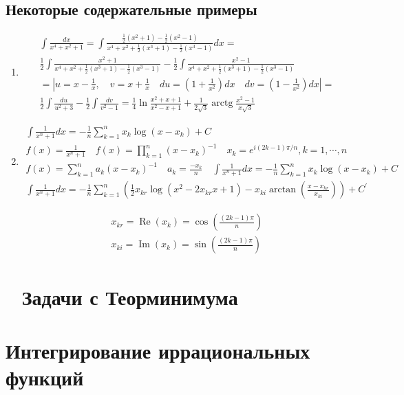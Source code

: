 \documentclass[a4paper,12pt]{article}
\begin{document}
	\subsection{Некоторые содержательные примеры}
	\begin{enumerate}
		\item
			$$
			\begin{aligned}
				\int \frac{d x}{x^{4}+x^{2}+1}=\int \frac{\frac{1}{2}\left(x^{2}+1\right)-\frac{1}{2}\left(x^{2}-1\right)}{x^{4}+x^{2} + \frac{1}{2}\left(x^{3}+1\right)-\frac{1}{2}\left(x^{3}-1\right)} d x =\\ \frac{1}{2} \int \frac{x^{2}+1}{x^4+x^2+\frac{1}{2}\left(x^3+1\right)-\frac{1}{2}\left(x^3-1\right)} -
				\frac{1}{2} \int \frac{x^{2}-1}{x^4+x^2+\frac{1}{2}\left(x^3+1\right)-\frac{1}{2}\left(x^3-1\right)} \\
				=\left|u=x-\frac{1}{x}, \quad v=x+\frac{1}{x} \quad  d u = \left(1+\frac{1}{x^2}\right) d x \quad d v = \left(1-\frac{1}{x^2}\right) d x\right| =\\
				\frac{1}{2} \int \frac{du}{u^2+3} - \frac{1}{2} \int \frac{dv}{v^2-1}=\frac{1}{4} \ln \frac{x^{2}+x+1}{x^{2}-x+1}+\frac{1}{2 \sqrt{3}} \operatorname{arctg} \frac{x^{2}-1}{x \sqrt{3}}	
			\end{aligned}
			$$
		\item 
			$$
			\begin{aligned}
			\int \frac{1}{x^{n}+1} d x=-\frac{1}{n} \sum_{k=1}^{n} x_{k} \log \left(x-x_{k}\right)+C \\
			f(x)=\frac{1}{x^{n}+1} \quad f(x)=\prod_{k=1}^{n}\left(x-x_{k}\right)^{-1} 
		    \quad x_{k}=e^{i(2 k-1) \pi / n}, k=1, \cdots, n \\
			f(x)=\sum_{k=1}^{n} a_{k}\left(x-x_{k}\right)^{-1} 
			\quad a_{k}=\frac{-x_{k}}{n}
			\quad
			\int \frac{1}{x^{n}+1} d x=-\frac{1}{n} \sum_{k=1}^{n} x_{k} \log \left(x-x_{k}\right)+C\\
			\int \frac{1}{x^{n}+1} d x=-\frac{1}{n} \sum_{k=1}^{n}\left(\frac{1}{2} x_{k r} \log \left(x^{2}-2 x_{k r} x+1\right)-x_{k i} \arctan \left(\frac{x-x_{k r}}{x_{k i}}\right)\right)+C^{\prime}
			\end{aligned}
			$$	
			
			$$
			\begin{array}{l}{x_{k r}=\operatorname{Re}\left(x_{k}\right)=\cos \left(\frac{(2 k-1) \pi}{n}\right)} \\ {x_{k i}=\operatorname{Im}\left(x_{k}\right)=\sin \left(\frac{(2 k-1) \pi}{n}\right)}\end{array}
			$$
			\section{Задачи с Теорминимума}			
			
	\end{enumerate}
	



	\section{Интегрирование иррациональных функций}

	
\end{document}
